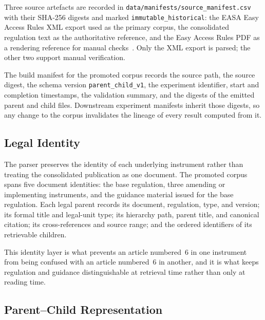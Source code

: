 Three source artefacts are recorded in \texttt{data/manifests/source\_manifest.csv} with their SHA-256 digests and marked \texttt{immutable\_historical}: the \ac{EASA} Easy Access Rules XML export used as the primary corpus, the consolidated regulation text as the authoritative reference, and the Easy Access Rules PDF as a rendering reference for manual checks~\cite{eu2014reg376,easa2022easyaccess376}. Only the XML export is parsed; the other two support manual verification.


The build manifest for the promoted corpus records the source path, the source digest, the schema version \texttt{parent\_child\_v1}, the experiment identifier, start and completion timestamps, the validation summary, and the digests of the emitted parent and child files. Downstream experiment manifests inherit those digests, so any change to the corpus invalidates the lineage of every result computed from it.

\subsection{Legal Identity}

The parser preserves the identity of each underlying instrument rather than treating the consolidated publication as one document. The promoted corpus spans five document identities: the base regulation, three amending or implementing instruments, and the guidance material issued for the base regulation. Each legal parent records its document, regulation, type, and version; its formal title and legal-unit type; its hierarchy path, parent title, and canonical citation; its cross-references and source range; and the ordered identifiers of its retrievable children.

This identity layer is what prevents an article numbered~6 in one instrument from being confused with an article numbered~6 in another, and it is what keeps regulation and guidance distinguishable at retrieval time rather than only at reading time.

\subsection{Parent--Child Representation}

